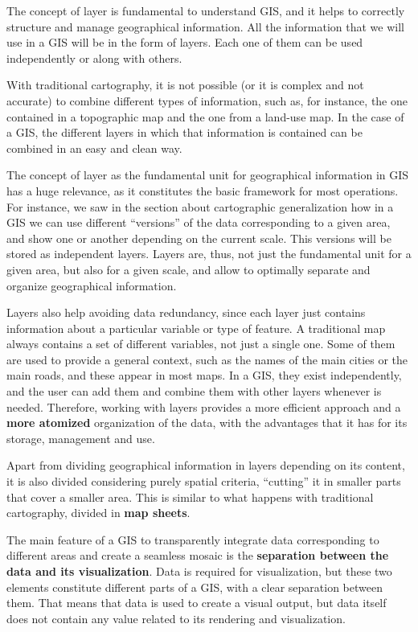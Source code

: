 The concept of layer is fundamental to understand GIS, and it helps to correctly structure and manage geographical information. All the information that we will use in a GIS will be in the form of layers. Each one of them can be used independently or along with others.

With traditional cartography, it is not possible (or it is complex and not accurate) to combine different types of information, such as, for instance, the one contained in a topographic map and the one from a land-use map. In the case of a GIS, the different layers in which that information is contained can be combined in an easy and clean way.

The concept of layer as the fundamental unit for geographical information in GIS has a huge relevance, as it constitutes the basic framework for most operations. For instance, we saw in the section about cartographic generalization how in a GIS we can use different ``versions'' of the data corresponding to a given area, and show one or another depending on the current scale. This versions will be stored as independent layers. Layers are, thus, not just the fundamental unit for a given area, but also for a given scale, and allow to optimally separate and organize geographical information. 

Layers also help avoiding data redundancy, since each layer just contains information about a particular variable or type of feature. A traditional map always contains a set of different variables, not just a single one. Some of them are used to provide a general context, such as the names of the main cities or the main roads, and these appear in most maps. In a GIS, they exist independently, and the user can add them and combine them with other layers whenever is needed. Therefore, working with layers provides a more efficient approach and a \textbf{more atomized} organization of the data, with the advantages that it has for its storage, management and use.

Apart from dividing geographical information in layers depending on its content, it is also divided considering purely spatial criteria, ``cutting'' it in smaller parts that cover a smaller area. This is similar to what happens with traditional cartography, divided in \textbf{map sheets}.

The main feature of a GIS to transparently integrate data corresponding to different areas and create a seamless mosaic is the \textbf{separation between the data and its visualization}. Data is required for visualization, but these two elements constitute different parts of a GIS, with a clear separation between them. That means that data is used to create a visual output, but data itself does not contain any value related to its rendering and visualization.

